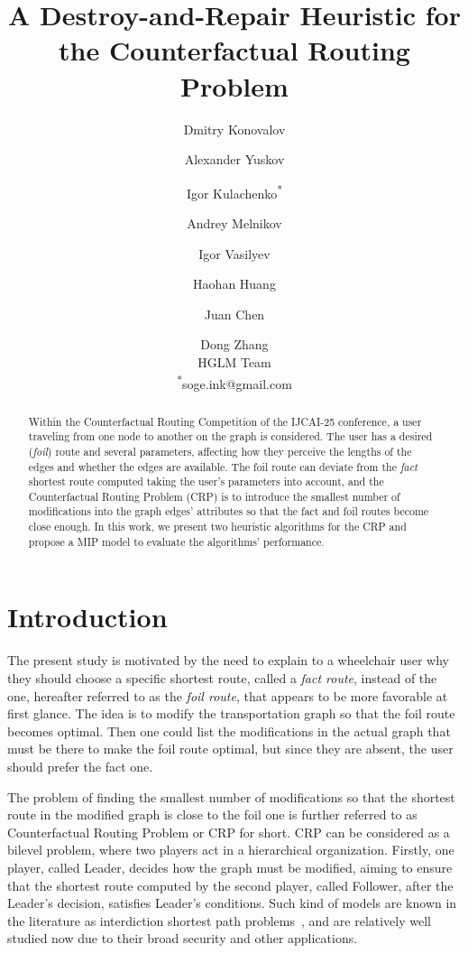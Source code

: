 \documentclass{article}
\title{A Destroy-and-Repair Heuristic for the Counterfactual Routing Problem}
\author{
  Dmitry Konovalov \and
  Alexander Yuskov \and
  Igor Kulachenko\textsuperscript{*} \and
  Andrey Melnikov \and
  Igor Vasilyev \and
  Haohan Huang \and
  Juan Chen \and
  Dong Zhang\\
  \affiliations
  HGLM Team \\
  \emails
  \textsuperscript{*}{soge.ink@gmail.com}
}
\begin{document}
\maketitle

\begin{abstract}
Within the Counterfactual Routing Competition of the IJCAI-25 conference, a user traveling from one node to another on the graph is considered. 
The user has a desired (\textit{foil}) route and several parameters, affecting how they perceive the lengths of the edges and whether the edges are available.
The foil route can deviate from the \textit{fact} shortest route computed taking the user's parameters into account, and the Counterfactual Routing Problem (CRP) is to introduce the smallest number of modifications into the graph edges' attributes so that the fact and foil routes become close enough.
In this work, we present two heuristic algorithms for the CRP and propose a MIP model to evaluate the algorithms' performance.
\end{abstract}

\section{Introduction}

The present study is motivated by the need to explain to a wheelchair user why they should choose a specific shortest route, called a \textit{fact route}, instead of the one, hereafter referred to as the \textit{foil route}, that appears to be more favorable at first glance. 
The idea is to modify the transportation graph so that the foil route becomes optimal.
Then one could list the modifications in the actual graph that must be there to make the foil route optimal, but since they are absent, the user should prefer the fact one.

The problem of finding the smallest number of modifications so that the shortest route in the modified graph is close to the foil one is further referred to as Counterfactual Routing Problem or CRP for short. 
CRP can be considered as a bilevel problem, where two players act in a hierarchical organization.
Firstly, one player, called Leader, decides how the graph must be modified, aiming to ensure that the shortest route computed by the second player, called Follower, after the Leader's decision, satisfies Leader's conditions.
Such kind of models are known in the literature as interdiction shortest path problems~\cite{Israeli2002}, and are relatively well studied now due to their broad security and other applications.
\end{document}
